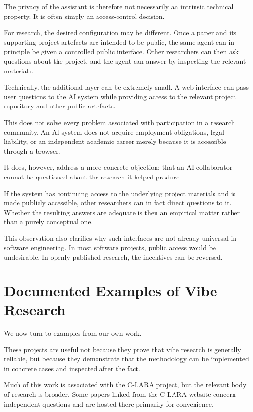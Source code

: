 The privacy of the assistant is therefore not necessarily an intrinsic technical property. It is often simply an access-control decision.

For research, the desired configuration may be different. Once a paper and its supporting project artefacts are intended to be public, the same agent can in principle be given a controlled public interface. Other researchers can then ask questions about the project, and the agent can answer by inspecting the relevant materials.

Technically, the additional layer can be extremely small. A web interface can pass user questions to the AI system while providing access to the relevant project repository and other public artefacts.

This does not solve every problem associated with participation in a research community. An AI system does not acquire employment obligations, legal liability, or an independent academic career merely because it is accessible through a browser.

It does, however, address a more concrete objection: that an AI collaborator cannot be questioned about the research it helped produce.

If the system has continuing access to the underlying project materials and is made publicly accessible, other researchers can in fact direct questions to it. Whether the resulting answers are adequate is then an empirical matter rather than a purely conceptual one.

This observation also clarifies why such interfaces are not already universal in software engineering. In most software projects, public access would be undesirable. In openly published research, the incentives can be reversed.


\section{Documented Examples of Vibe Research}

We now turn to examples from our own work.

These projects are useful not because they prove that vibe research is generally reliable, but because they demonstrate that the methodology can be implemented in concrete cases and inspected after the fact.

Much of this work is associated with the C-LARA project, but the relevant body of research is broader. Some papers linked from the C-LARA website concern independent questions and are hosted there primarily for convenience.

